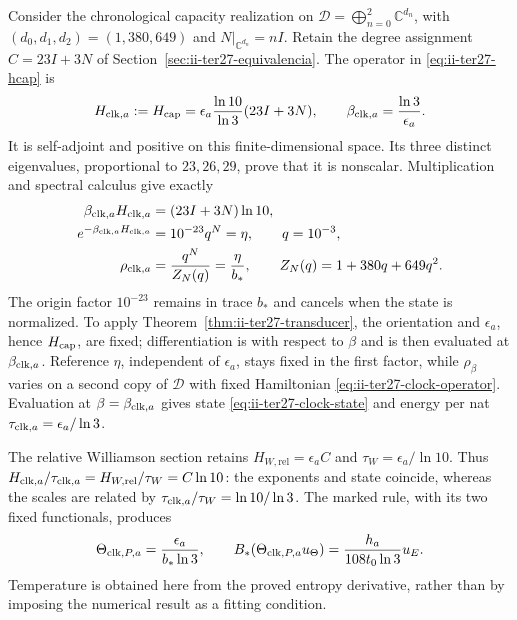 Consider the chronological capacity realization on
$\mathcal D=\bigoplus_{n=0}^2\mathbb C^{d_n}$, with
$(d_0,d_1,d_2)=(1,380,649)$ and $N|_{\mathbb C^{d_n}}=nI$.
Retain the degree assignment $C=23I+3N$ of
Section~\ref{sec:ii-ter27-equivalencia}. The operator in
\eqref{eq:ii-ter27-hcap} is
\begin{equation}
 H_{{\rm clk},a}:=H_{\rm cap}
 =\epsilon_a\frac{\ln10}{\ln3}(23I+3N),\qquad
 \beta_{{\rm clk},a}=\frac{\ln3}{\epsilon_a}.
 \label{eq:ii-ter27-clock-operator}
\end{equation}
It is self-adjoint and positive on this finite-dimensional space. Its
three distinct eigenvalues, proportional to $23,26,29$, prove that it is
nonscalar. Multiplication and spectral calculus give exactly
\begin{align}
 \beta_{{\rm clk},a}H_{{\rm clk},a}
   &=(23I+3N)\ln10,\nonumber\\
 e^{-\beta_{{\rm clk},a}H_{{\rm clk},a}}
   &=10^{-23}q^N=\eta,\qquad q=10^{-3},\nonumber\\
 \rho_{{\rm clk},a}
   &=\frac{q^N}{Z_N(q)}=\frac{\eta}{b_*},\qquad
 Z_N(q)=1+380q+649q^2.
 \label{eq:ii-ter27-clock-state}
\end{align}
The origin factor $10^{-23}$ remains in trace $b_*$ and cancels when the
state is normalized. To apply Theorem~\ref{thm:ii-ter27-transducer},
the orientation and $\epsilon_a$, hence $H_{\rm cap}$, are fixed;
differentiation is with respect to $\beta$ and is then evaluated at
$\beta_{{\rm clk},a}$. Reference $\eta$, independent of $\epsilon_a$,
stays fixed in the first factor, while $\rho_\beta$ varies on a
second copy of $\mathcal D$ with fixed Hamiltonian
\eqref{eq:ii-ter27-clock-operator}. Evaluation at
$\beta=\beta_{{\rm clk},a}$ gives state
\eqref{eq:ii-ter27-clock-state} and energy per nat
$\tau_{{\rm clk},a}=\epsilon_a/\ln3$.

The relative Williamson section retains
$H_{W,\mathrm{rel}}=\epsilon_a C$ and
$\tau_W=\epsilon_a/\ln10$. Thus
$H_{{\rm clk},a}/\tau_{{\rm clk},a}
 =H_{W,\mathrm{rel}}/\tau_W=C\ln10$:
the exponents and state coincide, whereas the scales are related by
$\tau_{{\rm clk},a}/\tau_W=\ln10/\ln3$.
The marked rule, with its two fixed functionals, produces
\begin{equation}
 \Theta_{{\rm clk},P,a}=\frac{\epsilon_a}{b_*\ln3},\qquad
 B_*(\Theta_{{\rm clk},P,a}u_\Theta)
 =\frac{h_a}{108t_0\ln3}u_E.
 \label{eq:ii-ter27-section-test}
\end{equation}
Temperature is obtained here from the proved entropy derivative, rather
than by imposing the numerical result as a fitting condition.

